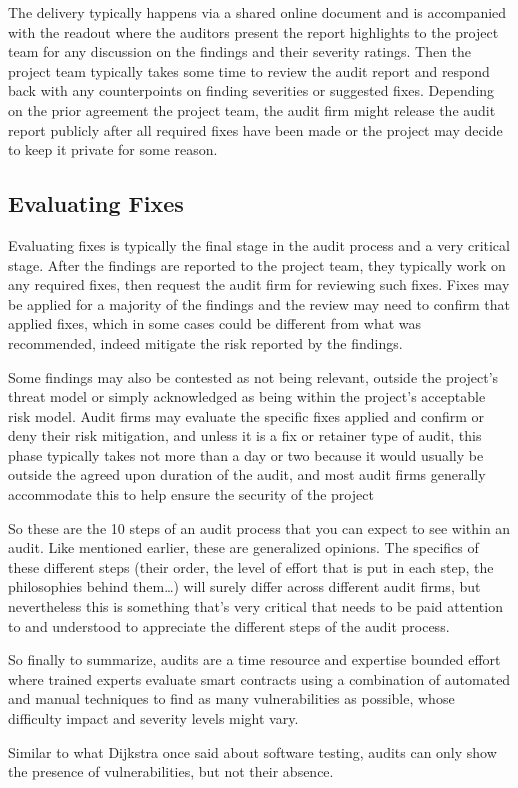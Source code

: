 The delivery typically happens via a shared online document and is
accompanied with the readout where the auditors present the report
highlights to the project team for any discussion on the findings and
their severity ratings. Then the project team typically takes some time
to review the audit report and respond back with any counterpoints on
finding severities or suggested fixes. Depending on the prior agreement
the project team, the audit firm might release the audit report publicly
after all required fixes have been made or the project may decide to
keep it private for some reason.

\subsection{Evaluating Fixes}\label{evaluating-fixes}

Evaluating fixes is typically the final stage in the audit process and a
very critical stage. After the findings are reported to the project
team, they typically work on any required fixes, then request the audit
firm for reviewing such fixes. Fixes may be applied for a majority of
the findings and the review may need to confirm that applied fixes,
which in some cases could be different from what was recommended, indeed
mitigate the risk reported by the findings.

Some findings may also be contested as not being relevant, outside the
project's threat model or simply acknowledged as being within the
project's acceptable risk model. Audit firms may evaluate the specific
fixes applied and confirm or deny their risk mitigation, and unless it
is a fix or retainer type of audit, this phase typically takes not more
than a day or two because it would usually be outside the agreed upon
duration of the audit, and most audit firms generally accommodate this
to help ensure the security of the project

So these are the 10 steps of an audit process that you can expect to see
within an audit. Like mentioned earlier, these are generalized opinions.
The specifics of these different steps (their order, the level of effort
that is put in each step, the philosophies behind them\ldots) will
surely differ across different audit firms, but nevertheless this is
something that's very critical that needs to be paid attention to and
understood to appreciate the different steps of the audit process.

So finally to summarize, audits are a time resource and expertise
bounded effort where trained experts evaluate smart contracts using a
combination of automated and manual techniques to find as many
vulnerabilities as possible, whose difficulty impact and severity levels
might vary.

Similar to what Dijkstra once said about software testing, audits can
only show the presence of vulnerabilities, but not their absence.
